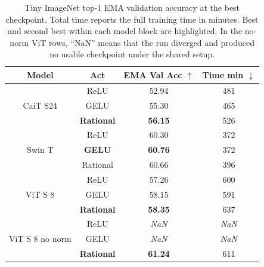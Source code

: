 \documentclass{article}
\theoremstyle{plain}
\theoremstyle{definition}
\theoremstyle{remark}
\begin{document}
\begin{table}
\centering
\caption{Tiny ImageNet top-1 EMA validation accuracy at the best checkpoint. Total time reports the full training time in minutes. Best and second best within each model block are highlighted.  {In the no-norm ViT rows, ``NaN'' means that the run diverged and produced no usable checkpoint under the shared setup.}}
\label{tab:tinyimg_all_rearranged}
\renewcommand{\arraystretch}{1.08}
\scriptsize
\begin{tabular}{cccc}
\toprule
Model & Act & EMA Val Acc $\uparrow$ & Time min $\downarrow$ \\
\midrule
\multirow{3}{*}{CaiT S24} 
& ReLU & 52.94 & 481 \\
& GELU & 55.30 & 465 \\
& \textbf{Rational} & \textbf{56.15} & 526 \\
\midrule
\multirow{3}{*}{Swin T} 
& ReLU & 60.30 & 372 \\
& \textbf{GELU} & \textbf{60.76} & 372 \\
& Rational & 60.66 & 396 \\
\midrule
\multirow{3}{*}{ViT S 8} 
& ReLU & 57.26 & 600 \\
& GELU & 58.15 & 591 \\
& \textbf{Rational} & \textbf{58.35} & 637 \\
\midrule
\multirow{3}{*}{ViT S 8 no norm} & ReLU &  {\textit{NaN}} &  {\textit{NaN}} \\
& GELU &  {\textit{NaN}} &  {\textit{NaN}} \\
& \textbf{Rational} & \textbf{61.24} & 611 \\
\bottomrule
\end{tabular}
\end{table}

\end{document}
